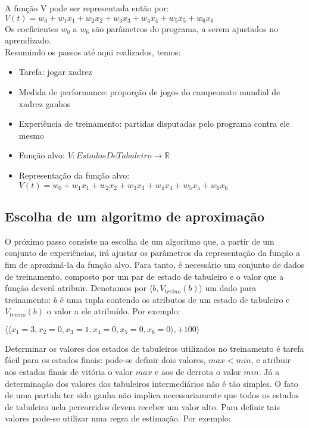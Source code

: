 A função V pode ser representada então por:
\\
$V(t) = w_0 + w_1 x_1 + w_2 x_2 + w_3 x_3 + w_4 x_4 + w_5 x_5 + w_6 x_6$
\\
Os coeficientes $w_0$ a $w_6$ são parâmetros do programa, a serem ajustados no aprendizado.
\\
Resumindo os passos até aqui realizados, temos:

\begin{itemize}
\item Tarefa: jogar xadrez
\item Medida de performance: proporção de jogos do campeonato mundial de xadrez ganhos
\item Experiência de treinamento: partidas disputadas pelo programa contra ele mesmo
\item Função alvo: $V:EstadosDeTabuleiro \rightarrow \mathbb{R}$
\item Representação da função alvo: $V(t) = w_0 + w_1 x_1 + w_2 x_2 + w_3 x_3 + w_4 x_4 + w_5 x_5 + w_6 x_6$
\end{itemize}

\subsection*{Escolha de um algoritmo de aproximação}

O próximo passo consiste na escolha de um algoritmo que, a partir de um conjunto de experiências, irá ajustar os parâmetros da representação da função a fim de aproximá-la da função alvo. Para tanto, é necessário um conjunto de dados de treinamento, composto por um par de estado de tabuleiro e o valor que a função deverá atribuir. Denotamos por $\langle b, V_{treino}(b) \rangle $ um dado para treinamento: $b$ é uma tupla contendo os atributos de um estado de tabuleiro e $V_{treino}(b)$ o valor a ele atribuído. Por exemplo:

$\langle \langle x_1 = 3, x_2 = 0, x_3 = 1, x_4 = 0, x_5 = 0, x_6 = 0 \rangle, +100\rangle$

Determinar os valores dos estados de tabuleiros utilizados no treinamento é tarefa fácil para os estados finais: pode-se definir dois valores, $max < min$, e atribuir aos estados finais de vitória o valor $max$ e aos de derrota o valor $min$. Já a determinação dos valores dos tabuleiros intermediários não é tão simples. O fato de uma partida ter sido ganha não implica necessariamente que todos os estados de tabuleiro nela percorridos devem receber um valor alto. Para definir tais valores pode-se utilizar uma regra de estimação. Por exemplo:

